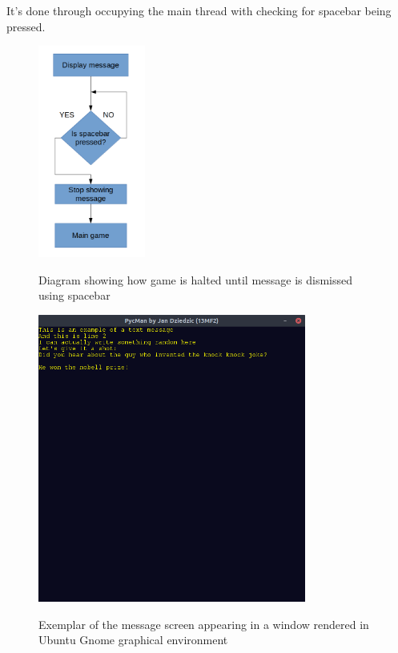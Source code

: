 \documentclass[11pt,a4paper,notitlepage]{report}
\newenvironment{img}{
	\begin{center}
		\begin{figure}[H]
			\begin{center}
			
}{
	\end{center}
		\end{figure}
			\end{center}
}
\begin{document}
			It's done through occupying the main thread with checking for spacebar being pressed.
			\begin{img}
				\includegraphics[width=100pt]{images/message-dismiss}\\
				\caption{Diagram showing how game is halted until message is dismissed using spacebar}
			\end{img}
			\begin{img}
				\includegraphics[width=250pt]{images/message-example-joke}\\
				\caption{Exemplar of the message screen appearing in a window rendered in Ubuntu Gnome graphical environment}
			\end{img}
\end{document}
